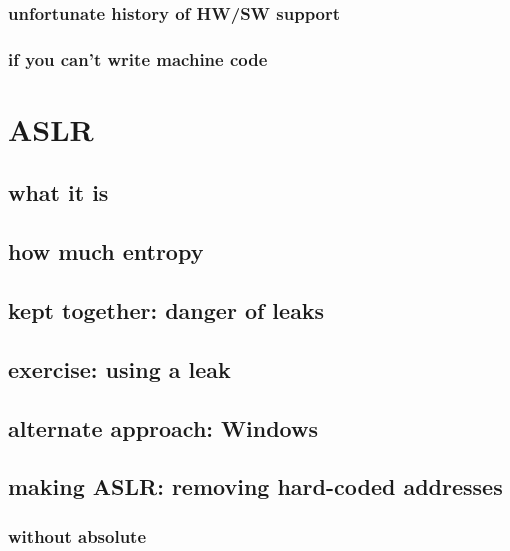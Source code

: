 \subsubsection{unfortunate history of HW/SW support}


\subsubsection{if you can't write machine code}


\section{ASLR}
\subsection{what it is}


\subsection{how much entropy}


\subsection{kept together: danger of leaks}



\subsection{exercise: using a leak}



\subsection{alternate approach: Windows}


\subsection{making ASLR: removing hard-coded addresses}


\subsubsection{without absolute}


